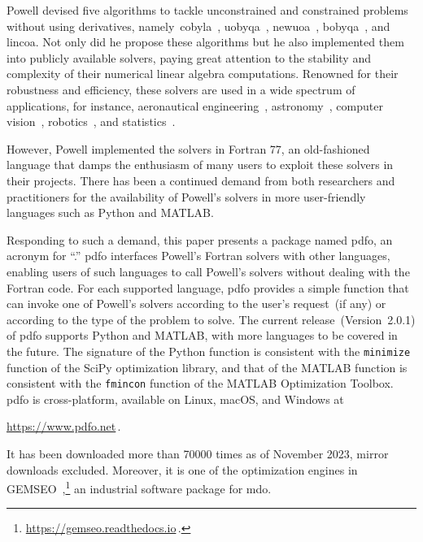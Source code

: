 \documentclass[
    smallextended,  %
    final,          %
]{svjour3}
\newcommand{\modified}[1]{\texorpdfstring{{\color{RoyalBlue}#1}}{#1}}
\begin{document}
Powell devised five algorithms to tackle unconstrained and constrained problems without using derivatives, namely~\gls{cobyla}~\cite{Powell_1994}, \gls{uobyqa}~\cite{Powell_2002}, \gls{newuoa}~\cite{Powell_2006}, \gls{bobyqa}~\cite{Powell_2009}, and \gls{lincoa}.
\modified{Not only did he} propose these algorithms but \modified{he} also implemented them into publicly available solvers, paying great attention to the stability and complexity of their numerical linear algebra computations.
Renowned for their robustness and efficiency, these solvers are used in a wide spectrum of applications, for instance, aeronautical engineering~\cite{Gallard_Etal_2018}, astronomy~\cite{Mamon_Biviano_Boue_2013}, computer vision~\cite{Izadinia_Shan_Seitz_2017}, robotics~\cite{Mombaur_Truong_Laumond_2010}, and statistics~\cite{Bates_Etal_2015}.

However, Powell \modified{implemented} the solvers in Fortran 77, an \modified{old-fashioned} language that damps the enthusiasm of many users to exploit these solvers in their projects.
There has been a continued demand from both researchers and practitioners for the availability of Powell's solvers in more user-friendly languages such as Python and MATLAB.

Responding to such a demand, this paper presents a package named \gls{pdfo}, an acronym for ``.''
\Gls{pdfo} interfaces Powell's Fortran solvers with other languages, enabling users of such languages to call Powell's solvers without dealing with the Fortran code.
For each supported language, \gls{pdfo} provides a simple function that can invoke one of Powell's solvers according to the user's request~(if any) or according to the type of the problem to solve.
The current release~(Version~\modified{2.0.1}) of \gls{pdfo} supports Python and MATLAB, with more languages to be covered in the future.
The signature of the Python function is consistent with the \texttt{minimize} function of the SciPy optimization library, and that of the MATLAB function is consistent with the \texttt{fmincon} function of the MATLAB Optimization Toolbox.
\Gls{pdfo} is cross-platform, available on Linux, macOS, and Windows at
\begin{center}
    \url{https://www.pdfo.net}\,.
\end{center}
It has been downloaded more than \modified{\num{70000}} times as of \modified{November} 2023, mirror downloads excluded.
Moreover, it is one of the optimization engines in GEMSEO~\cite{Gallard_Etal_2018},\footnote{\url{https://gemseo.readthedocs.io}\,.} an industrial software package for \gls{mdo}.
\end{document}
